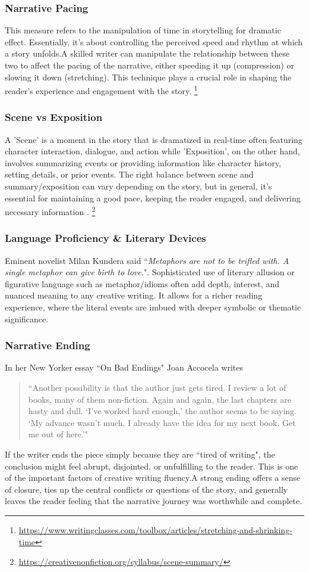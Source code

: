 \subsubsection{Narrative Pacing} 
This measure refers to the manipulation of time in storytelling for dramatic effect. Essentially, it's about controlling the perceived speed and rhythm at which a story unfolds.A skilled writer can manipulate the relationship between these two to affect the pacing of the narrative, either speeding it up (compression) or slowing it down (stretching). This technique plays a crucial role in shaping the reader's experience and engagement with the story. 
\footnote{\url{https://www.writingclasses.com/toolbox/articles/stretching-and-shrinking-time}}
\subsubsection{Scene vs Exposition}
A 'Scene' is a moment in the story that is dramatized in real-time often featuring character interaction, dialogue, and action while 'Exposition', on the other hand, involves summarizing events or providing information like character history, setting details, or prior events. The right balance between scene and summary/exposition can vary depending on the story, but in general, it's essential for maintaining a good pace, keeping the reader engaged, and delivering necessary information \cite{burroway2019writing}. 
\footnote{\url{https://creativenonfiction.org/syllabus/scene-summary/}}
\subsubsection{Language Proficiency \& Literary Devices} 
Eminent novelist Milan Kundera said ``\textit{Metaphors are not to be trifled with. A single metaphor can give birth to love.}". Sophisticated use of literary allusion or figurative language such as metaphor/idioms often add depth, interest, and nuanced meaning to any creative writing. It allows for a richer reading experience, where the literal events are imbued with deeper symbolic or thematic significance. 
\subsubsection{Narrative Ending}
In her New Yorker essay ``On Bad Endings" \cite{BadEndings} Joan Accocela writes 
            \begin{quote}
                \centering
                ``Another possibility is that the author just gets tired. I review a lot of books, many of them non-fiction. Again and again, the last chapters are hasty and dull. `I’ve worked hard enough,' the author seems to be saying. `My advance wasn’t much. I already have the idea for my next book. Get me out of here.'"
            \end{quote}
If the writer ends the piece simply because they are ``tired of writing", the conclusion might feel abrupt, disjointed, or unfulfilling to the reader. This is one of the important factors of creative writing fluency.A strong ending offers a sense of closure, ties up the central conflicts or questions of the story, and generally leaves the reader feeling that the narrative journey was worthwhile and complete.
